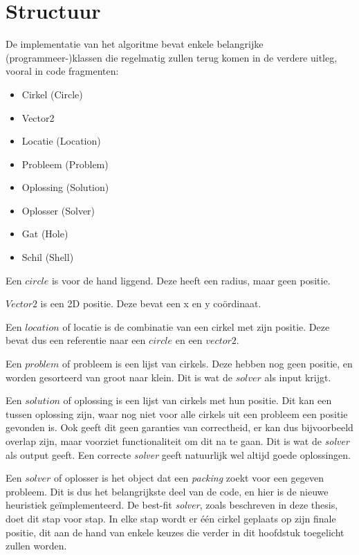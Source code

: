 \documentclass[12pt,a4paper,oneside]{book}
\begin{document}
\section{Structuur}

De implementatie van het algoritme bevat enkele belangrijke (programmeer-)klassen die regelmatig zullen terug komen in de verdere uitleg, vooral in code fragmenten:

\begin{itemize} 
\item Cirkel (Circle)
\item Vector2
\item Locatie (Location)
\item Probleem (Problem)
\item Oplossing (Solution)
\item Oplosser (Solver)
\item Gat (Hole)
\item Schil (Shell)
\end{itemize}

Een $circle$ is voor de hand liggend. Deze heeft een radius, maar geen positie.

$Vector2$ is een 2D positie. Deze bevat een x en y coördinaat.

Een $location$ of locatie is de combinatie van een cirkel met zijn positie. Deze bevat dus een referentie naar een $circle$ en een $vector2$.

Een $problem$ of probleem is een lijst van cirkels.
Deze hebben nog geen positie, en worden gesorteerd van groot naar klein.
Dit is wat de $solver$ als input krijgt.

Een $solution$ of oplossing is een lijst van cirkels met hun positie.
Dit kan een tussen oplossing zijn, waar nog niet voor alle cirkels uit een probleem een positie gevonden is.
Ook geeft dit geen garanties van correctheid, er kan dus bijvoorbeeld overlap zijn, maar voorziet functionaliteit om dit na te gaan.
Dit is wat de \textit{solver} als output geeft.
Een correcte \textit{solver} geeft natuurlijk wel altijd goede oplossingen.

Een $solver$ of oplosser is het object dat een \textit{packing} zoekt voor een gegeven probleem.
Dit is dus het belangrijkste deel van de code, en hier is de nieuwe heuristiek geïmplementeerd.
De best-fit \textit{solver}, zoals beschreven in deze thesis, doet dit stap voor stap.
In elke stap wordt er één cirkel geplaats op zijn finale positie, dit aan de hand van enkele keuzes die verder in dit hoofdstuk toegelicht zullen worden.
\end{document}
